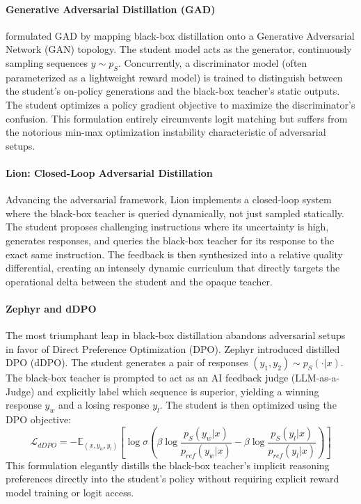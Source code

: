 \paragraph{Generative Adversarial Distillation (GAD)}
\citet{2511.10643} formulated GAD by mapping black-box distillation onto a Generative Adversarial Network (GAN) topology. The student model acts as the generator, continuously sampling sequences $y \sim p_S$. Concurrently, a discriminator model (often parameterized as a lightweight reward model) is trained to distinguish between the student's on-policy generations and the black-box teacher's static outputs. The student optimizes a policy gradient objective to maximize the discriminator's confusion. This formulation entirely circumvents logit matching but suffers from the notorious min-max optimization instability characteristic of adversarial setups.

\paragraph{Lion: Closed-Loop Adversarial Distillation}
Advancing the adversarial framework, Lion \citep{2310.01382} implements a closed-loop system where the black-box teacher is queried dynamically, not just sampled statically. The student proposes challenging instructions where its uncertainty is high, generates responses, and queries the black-box teacher for its response to the exact same instruction. The feedback is then synthesized into a relative quality differential, creating an intensely dynamic curriculum that directly targets the operational delta between the student and the opaque teacher.

\paragraph{Zephyr and dDPO}
The most triumphant leap in black-box distillation abandons adversarial setups in favor of Direct Preference Optimization (DPO). Zephyr \citep{2310.06694} introduced distilled DPO (dDPO). The student generates a pair of responses $(y_1, y_2) \sim p_S(\cdot|x)$. The black-box teacher is prompted to act as an AI feedback judge (LLM-as-a-Judge) and explicitly label which sequence is superior, yielding a winning response $y_w$ and a losing response $y_l$. The student is then optimized using the DPO objective:
\begin{equation}
    \mathcal{L}_{dDPO} = - \mathbb{E}_{(x, y_w, y_l)} \left[ \log \sigma \left( \beta \log \frac{p_S(y_w|x)}{p_{ref}(y_w|x)} - \beta \log \frac{p_S(y_l|x)}{p_{ref}(y_l|x)} \right) \right]
\end{equation}
This formulation elegantly distills the black-box teacher's implicit reasoning preferences directly into the student's policy without requiring explicit reward model training or logit access.

